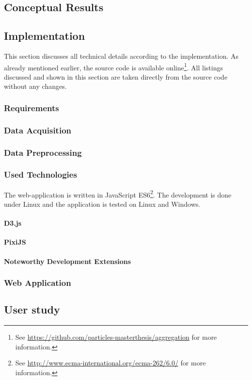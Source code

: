 \subsection{Conceptual Results}


\subsection{Implementation}
\cbstart
This section discusses all technical details according to the implementation. As already mentioned earlier, the source code is available online\footnote{See \href{https://github.com/particles-masterthesis/aggregation}{https://github.com/particles-masterthesis/aggregation} for more information.}. All listings discussed and shown in this section are taken directly from the source code without any changes.
\cbend

\subsubsection{Requirements}


\subsubsection{Data Acquisition}
\label{s:data-acquisition}


\subsubsection{Data Preprocessing}
\label{s:data-preprocessing}


\subsubsection{Used Technologies}
The web-application is written in JavaScript ES6\footnote{See \href{http://www.ecma-international.org/ecma-262/6.0/}{http://www.ecma-international.org/ecma-262/6.0/} for more information.}. The development is done under Linux and the application is tested on Linux and Windows.

\paragraph{D3.js}


\paragraph{PixiJS}


\paragraph{Noteworthy Development Extensions}


\subsubsection{Web Application}
\label{s:web-application}


\subsection{User study}

